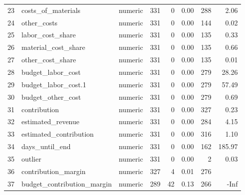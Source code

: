 \begin{sidewaystable}[ht]
\begin{tabular}{rllrrrrr}
  23 & costs\_of\_materials & numeric & 331 &   0 & 0.00 & 288 & 2.06 \\ 
  24 & other\_costs & numeric & 331 &   0 & 0.00 & 144 & 0.02 \\ 
  25 & labor\_cost\_share & numeric & 331 &   0 & 0.00 & 135 & 0.33 \\ 
  26 & material\_cost\_share & numeric & 331 &   0 & 0.00 & 135 & 0.66 \\ 
  27 & other\_cost\_share & numeric & 331 &   0 & 0.00 & 135 & 0.01 \\ 
  28 & budget\_labor\_cost & numeric & 331 &   0 & 0.00 & 279 & 28.26 \\ 
  29 & budget\_labor\_cost.1 & numeric & 331 &   0 & 0.00 & 279 & 57.49 \\ 
  30 & budget\_other\_cost & numeric & 331 &   0 & 0.00 & 279 & 0.69 \\ 
  31 & contribution & numeric & 331 &   0 & 0.00 & 327 & 0.23 \\ 
  32 & estimated\_revenue & numeric & 331 &   0 & 0.00 & 284 & 4.15 \\ 
  33 & estimated\_contribution & numeric & 331 &   0 & 0.00 & 316 & 1.10 \\ 
  34 & days\_until\_end & numeric & 331 &   0 & 0.00 & 162 & 185.97 \\ 
  35 & outlier & numeric & 331 &   0 & 0.00 &   2 & 0.03 \\ 
  36 & contribution\_margin & numeric & 327 &   4 & 0.01 & 276 &  \\ 
  37 & budget\_contribution\_margin & numeric & 289 &  42 & 0.13 & 266 & -Inf \\ 
   \hline
\end{tabular}
\end{sidewaystable}
